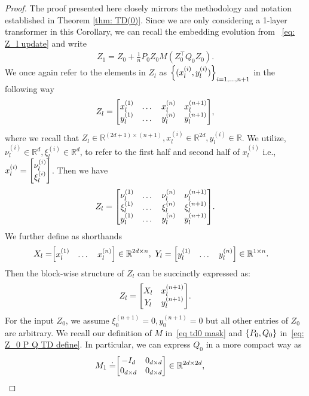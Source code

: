\documentclass{article}
\newcommand{\R}{\mathbb{R}}
\begin{document}
  \begin{proof}
    The proof presented here closely mirrors the methodology and notation established in Theorem \ref{thm: TD(0)}. Since we are only considering a 1-layer transformer in this Corollary, we can recall the embedding evolution from ~\eqref{eq: Z_l update} and write
    \begin{align}
        Z_{1} = Z_0 + \frac{1}{n} P_0 Z_0 M(Z_0^\top Q_0 Z_0).
    \end{align}
    We once again refer to the elements in $Z_l$ as $\qty{(x^{(i)}_l, y^{(i)}_l)}_{i=1,\dots, n+1}$ in the following way
    \begin{align}
        Z_l = \mqty[x_l^{(1)} & \dots & x_l^{(n)} & x_l^{(n+1)} \\ y_l^{(1)} & \dots & y_l^{(n)} & y_l^{(n+1)}],
    \end{align}
    where we recall that $Z_l \in \R^{(2d + 1) \times (n+1)}, x_l^{(i)} \in \R^{2d}, y^{(i)}_l \in \R$.
    We utilize, $\nu^{(i)}_l \in \R^d, \xi_l^{(i)} \in \R^d$, to refer to the first half and second half of $x_l^{(i)}$ i.e., $x_l^{(i)} = \mqty[\nu_l^{(i)} \\ \xi_l^{(i)}]$.
    Then we have
    \begin{align}
        Z_l = \mqty[\nu_l^{(1)} & \dots & \nu_l^{(n)} & \nu_l^{(n+1)} \\
        \xi_l^{(1)} & \dots & \xi_l^{(n)} & \xi_l^{(n+1)} \\
         y_l^{(1)} & \dots & y_l^{(n)} & y_l^{(n+1)}].
    \end{align}
    We further define as shorthands
    \begin{align}
        X_l =& \mqty[x_l^{(1)} & \dots & x_l^{(n)}] \in \R^{2d \times n}, \ Y_l =  \mqty[y_l^{(1)} & \dots & y_l^{(n)}] \in \R^{1 \times n}.
    \end{align}
    Then the block-wise structure of $Z_l$ can be succinctly expressed as:
    \begin{align}
        Z_l = \mqty[X_l & x_l^{(n+1)} \\ Y_l & y_l^{(n+1)}]. \label{eq: z_l blockwise X Y L1}
    \end{align}
    For the input $Z_0$,
    we assume $\xi_0^{(n+1)} = 0, y_0^{(n+1)} = 0$ but all other entries of $Z_0$ are arbitrary.
    We recall our definition of $M$ in~\eqref{eq td0 mask} and $\qty{P_0, Q_0}$ in~\eqref{eq: Z_0 P Q TD define}.
    In particular,
    we can express $Q_0$ in a more compact way as
\begin{align}
  M_1 \doteq& \mqty[-I_{d} &  0_{d \times d} \\0_{d \times d} & 0_{d \times d}] \in \R^{2d \times 2d}, \label{eq: L1 M_1 define} \

\end{align}
\end{proof}
\end{document}

